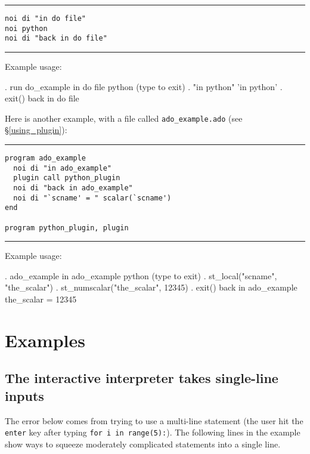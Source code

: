 \documentclass{article}
\begin{document}
\hrule
\begin{lstlisting}
noi di "in do file"
noi python
noi di "back in do file"
\end{lstlisting}
\hrule

\vspace{5mm}
\noindent Example usage:
\begin{stlog}
{\smallskip}
. run do_example
in do file
 python (type {} to exit) 
{\bftt{>>>}}. "in python"
'in python'
{\smallskip}
{\bftt{>>>}}. exit()
back in do file
\end{stlog}

\vspace{5mm}
\noindent Here is another example, with a file called \lstinline{ado_example.ado} (see \S\ref{using_plugin}): \newline

\hrule
\begin{lstlisting}
program ado_example
  noi di "in ado_example"
  plugin call python_plugin
  noi di "back in ado_example"
  noi di "`scname' = " scalar(`scname')
end

program python_plugin, plugin
\end{lstlisting}
\hrule

\medskip

\noindent Example usage:

\medskip

\begin{stlog}
. ado_example
in ado_example
 python (type {} to exit) 
{\bftt{>>>}}. st_local("scname", "the_scalar")
{\smallskip}
{\bftt{>>>}}. st_numscalar("the_scalar", 12345)
{\smallskip}
{\bftt{>>>}}. exit()
back in ado_example
the_scalar = 12345
\end{stlog}

	
	
\section{Examples} \label{examples}
	
\subsection{The interactive interpreter takes single-line inputs} \label{single_line_example}

The error below comes from trying to use a multi-line statement (the user hit the \lstinline$enter$ key after typing \lstinline$for i in range(5):$). The following lines in the example show ways to squeeze moderately complicated statements into a single line.
\end{document}
